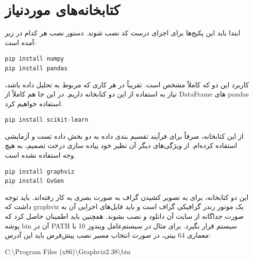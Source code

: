 \documentclass[12pt,titlepage,a4page , tikz , multi,table , svgnames,xcdraw]{article}
\begin{document}
\newpage

\section{کتابخانه‌های موردنیاز}

ابتدا باید این پکیج‌ها برای اجرای درست کد نصب شوند. دستور نصب هر کدام در زیر آمده است:

\begin{latin}
\begin{lstlisting}[language=Python]
pip install numpy
pip install pandas
\end{lstlisting}

\end{latin}

کاربرد این دو که کاملاً مشخص است. تقریباً در هر کاری که مربوط به تحلیل داده باشد، نیاز به استفاده از این دو کتابخانه داریم. در این جا هم کاملاً از DataFrame های pandas استفاده خواهیم کرد.


\begin{latin}
\begin{lstlisting}[language=Python]
pip install scikit-learn
\end{lstlisting}

\end{latin}

از این کتابخانه، صرفاً برای فرآیند تقسیم بندی داده به دو بخش داده تست و آزمایشی استفاده کرده‌ام. از ویژگی‌های دیگر آن نظیر خود پیاده سازی درخت تصمیم، به هیچ وجه استفاده نشده است.


\begin{latin}
\begin{lstlisting}[language=Python]
pip install graphviz
pip install GvGen
\end{lstlisting}

\end{latin}

این دو کتابخانه، برای به تصویر کشیدن گراف به صورت بصری به کار رفته‌اند. باید توجه داشت که graphviz یک موتور رندر گرافیکی گراف است و باید فایل‌های اجرایی آن به صورت جداگانه از سایت آن دانلود و نصب بشوند. همچنین باید اطمینان حاصل کرد که پوشه bin آن در PATH سیستم قرار بگیرد. برای مثال در سیستم‌عامل ویندوز 10 با معماری 64 بیتی، در صورت انتخاب مسیر نصب پیش‌فرض باید این آدرس:
\begin{center}
\begin{latin}
C:\textbackslash Program Files (x86)\textbackslash Graphviz2.38\textbackslash bin
\end{latin}
\end{center}
\end{document}
